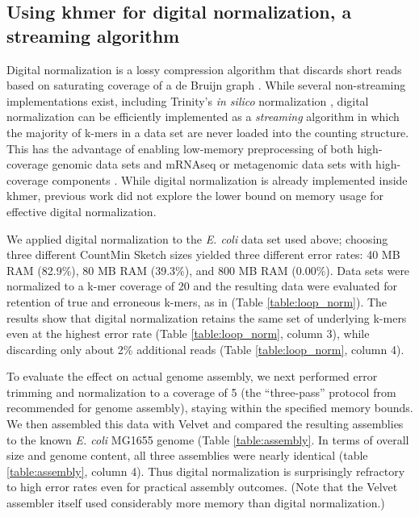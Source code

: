 \documentclass[10pt]{article}
\begin{document}
\subsection*{Using khmer for digital normalization, a streaming algorithm}

Digital normalization is a lossy compression algorithm that discards
short reads based on saturating coverage of a de Bruijn graph
\cite{Brown2012}.  While several non-streaming implementations exist, including
Trinity's {\em in silico} normalization \cite{Haas2013,Brown2012blog}, digital 
normalization can be efficiently implemented as a {\em
  streaming} algorithm in which the majority of k-mers in a data set
are never loaded into the counting structure.  This has the advantage of enabling 
low-memory preprocessing of both high-coverage genomic data sets and mRNAseq or
metagenomic data sets with high-coverage components \cite{Brown2012,
  Howe2012}.  While digital normalization is already
implemented inside khmer, previous work did not explore the lower bound
on memory usage for effective digital normalization.

We applied digital normalization to the {\em E. coli} data set used
above; choosing three different CountMin Sketch sizes yielded three different
error rates: 40 MB RAM (82.9\%), 80 MB RAM (39.3\%), and 800 MB RAM
(0.00\%).  Data sets were normalized to a k-mer coverage of 20 and the
resulting data were evaluated for retention of true and erroneous
k-mers, as in \cite{Brown2012} (Table \ref{table:loop_norm}).  The results show that
digital normalization retains the same set of underlying
k-mers even at the highest error rate (Table \ref{table:loop_norm}, column 3), 
while discarding only about 2\% additional reads (Table \ref{table:loop_norm}, column 4).

To evaluate the effect on actual genome assembly, we next performed
error trimming and normalization to a coverage of 5 (the
``three-pass'' protocol from \cite{Brown2012} recommended for
genome assembly), staying within the specified memory bounds.  We then
assembled this data with Velvet \cite{Zerbino2008} and compared the resulting 
assemblies to the known {\em E. coli} MG1655 genome (Table \ref{table:assembly}. 
In terms of overall size and genome content, all three assemblies were nearly identical 
(table \ref{table:assembly}, column 4).  Thus digital normalization is surprisingly 
refractory to high error rates even for practical assembly outcomes.  (Note that
the Velvet assembler itself used considerably more memory than digital
normalization.)
\end{document}
